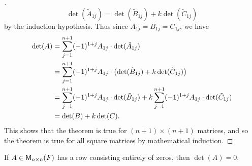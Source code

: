 \begin{proof}[]
  \[
    \det(\tilde{A}_{1 j}) = \det(\tilde{B}_{1 j}) + k \det(\tilde{C}_{1 j})
  \]
  by the induction hypothesis.
  Thus since \(A_{1 j} = B_{1 j} = C_{1 j}\), we have
  \begin{align*}
    \det(A) & = \sum_{j = 1}^{n + 1} (-1)^{1 + j} A_{1 j} \cdot \det(\tilde{A}_{1 j})                                                                           \\
            & = \sum_{j = 1}^{n + 1} (-1)^{1 + j} A_{1 j} \cdot \left\lparen\det(\tilde{B}_{1 j}) + k \det(\tilde{C}_{1 j})\right\rparen                                            \\
            & = \sum_{j = 1}^{n + 1} (-1)^{1 + j} A_{1 j} \cdot \det(\tilde{B}_{1 j}) + k \sum_{j = 1}^{n + 1} (-1)^{1 + j} A_{1 j} \cdot \det(\tilde{C}_{1 j}) \\
            & = \det(B) + k \det(C).
  \end{align*}
  This shows that the theorem is true for \((n + 1) \times (n + 1)\) matrices, and so the theorem is true for all square matrices by mathematical induction.
\end{proof}

\begin{cor}\label{4.2.4}
  If \(A \in \ms[n][n][\F]\) has a row consisting entirely of zeros, then \(\det(A) = 0\).
\end{cor}

